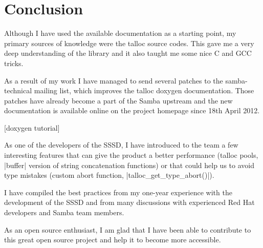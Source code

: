 \chapter{Conclusion}

Although I have used the available documentation as a starting point, my primary
sources of knowledge were the talloc source codes. This gave me a very deep
understanding of the library and it also taught me some nice C and GCC tricks.

As a result of my work I have managed to send several patches to the
samba-technical mailing list, which improves the talloc doxygen documentation.
Those patches have already become a part of the Samba upstream and the new
documentation is available online on the project homepage since 18th April 2012.

[doxygen tutorial]

As one of the developers of the SSSD, I have introduced to the team a few
interesting features that can give the product a better performance (talloc
pools, |buffer| version of string concatenation functions) or that could help
us to avoid type mistakes (custom abort function, |talloc_get_type_abort()|).

I have compiled the best practices from my one-year experience with the
development of the SSSD and from many discussions with experienced Red Hat
developers and Samba team members.

As an open source enthusiast, I am glad that I have been able to contribute to
this great open source project and help it to become more accessible.


% 
